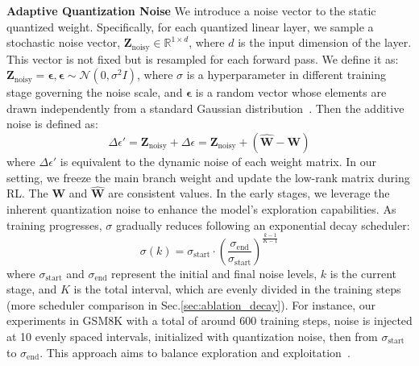 \textbf{Adaptive Quantization Noise} We introduce a noise vector to the static quantized weight. Specifically, for each quantized linear layer, we sample a stochastic noise vector, $\mathbf{Z}_{\text{noisy}} \in \mathbb{R}^{1\times d}$, where $d$ is the input dimension of the layer. This vector is not fixed but is resampled for each forward pass. We define it as: $\mathbf{Z}_{\text{noisy}} =\boldsymbol{\epsilon}, \boldsymbol{\epsilon} \sim \mathcal{N}(0, \sigma^2I)$, where $\sigma$ is a hyperparameter in different training stage governing the noise scale, and $\boldsymbol{\epsilon}$ is a random vector whose elements are drawn independently from a standard Gaussian distribution~\citep{plappert2017parameter}. Then the additive noise is defined as:
\begin{equation}\label{eq:dequant_fp_learn}
\Delta\epsilon'= \mathbf{Z}_{\text{noisy}}  + \Delta\epsilon= \mathbf{Z}_{\text{noisy}}  +  \left(\hat{\mathbf{W}} - \mathbf{W}\right)
\end{equation}
where $\Delta\epsilon'$ is equivalent to the dynamic noise of each weight matrix. In our setting, we freeze the main branch weight and update the low-rank matrix during RL. The $\mathbf{W}$ and $\hat{\mathbf{W}}$ are consistent values. In the early stages, we leverage the inherent quantization noise to enhance the model's exploration capabilities. As training progresses, $\sigma$ gradually reduces following an exponential decay scheduler:
\begin{equation}\label{eq:sigma_decy}
\sigma(k) = \sigma_{\text{start}} \cdot \left( \frac{\sigma_{\text{end}}}{\sigma_{\text{start}}} \right)^{\frac{k - 1}{K - 1}}
\end{equation}
where $\sigma_{\text{start}}$ and $\sigma_{\text{end}}$ represent the initial and final noise levels, $k$ is the current stage, and $K$ is the total interval, which are evenly divided in the training steps (more scheduler comparison in Sec.\ref{sec:ablation_decay}). For instance, our experiments in GSM8K with a total of around 600 training steps, noise is injected at 10 evenly spaced intervals, initialized with quantization noise, then from $\sigma_{\text{start}}$ to $\sigma_{\text{end}}$. This approach aims to balance exploration and exploitation~\citep{fox2015taming}.

